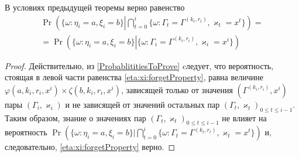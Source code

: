 \documentclass[a4paper,12pt,russian]{extarticle}
\newcommand{\ga}[1]{\Gamma^{\left( #1 \right)} }
\newcommand{\ml}[1]{\begin{multline}#1\end{multline}}
\begin{document}
\begin{corollary}
В условиях предыдущей теоремы верно равенство
\ml
{
\Pr \left(\{ \omega \colon \eta_i = a, \xi_i=b\} \left|\bigcap_{t=0}^{i}\{\omega\colon \Gamma_t=\ga{k_t,r_t}, \varkappa_t=x^t\}\right.\right)=\\
=\Pr \left(\{ \omega \colon \eta_i = a, \xi_i=b\} \left|\{\omega\colon \Gamma_i=\ga{k_i,r_i}, \varkappa_i=x^i\}\right.\right)
\label{eta:xi:forgetProperty}
}

\label{eta:xi:forget}
\end{corollary}
\begin{proof}
Действительно, из \eqref{ProbablititiesToProve} cледует, что вероятность, стоящая в левой части равенства \eqref{eta:xi:forgetProperty}, равна величине $\varphi(a,k_i,r_i,x^i)\times \zeta(b,k_i,r_i,x^i)$, зависящей только от значения $(\ga{k_i,r_i},x^i)$ пары $(\Gamma_i,\varkappa_i)$ и не зависящей от значений остальных пар $(\Gamma_t,\varkappa_t)_{0\leqslant t \leqslant i-1}$. Таким образом, знание о значениях пар $(\Gamma_t,\varkappa_t)_{0\leqslant t \leqslant i-1}$ не влияет на вероятность $\Pr (\{ \omega \colon \eta_i = a, \xi_i=b\} |\bigcap_{t=0}^{i}\{\omega\colon \Gamma_t=\ga{k_t,r_t}, \varkappa_t=x^t\})$ и, следовательно, \eqref{eta:xi:forgetProperty} верно.

\end{proof}
\end{document}
